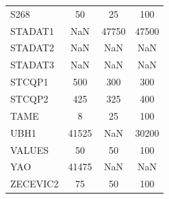 \begin{longtable}{lccc}
S268     &    50 &    25 &    100 \\
STADAT1  &   NaN & 47750 &  47500 \\
STADAT2  &   NaN &   NaN &    NaN \\
STADAT3  &   NaN &   NaN &    NaN \\
STCQP1   &   500 &   300 &    300 \\
STCQP2   &   425 &   325 &    400 \\
TAME     &     8 &    25 &    100 \\
UBH1     & 41525 &   NaN &  30200 \\
VALUES   &    50 &    50 &    100 \\
YAO      & 41475 &   NaN &    NaN \\
ZECEVIC2 &    75 &    50 &    100 \\
\end{longtable}

